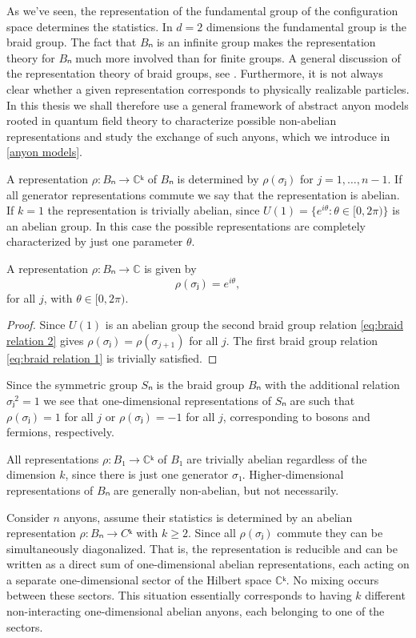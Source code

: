 As we've seen, the representation of the fundamental group of the configuration space determines the statistics. In $d=2$ dimensions the fundamental group is the braid group. The fact that $Bₙ$ is an infinite group makes the representation theory for $Bₙ$ much more involved than for finite groups. A general discussion of the representation theory of braid groups, see \cite{oskar}. Furthermore, it is not always clear whether a given representation corresponds to physically realizable particles. In this thesis we shall therefore use a general framework of abstract anyon models rooted in quantum field theory to characterize possible non-abelian representations and study the exchange of such anyons, which we introduce in \cref{anyon models}.

A representation $ρ:Bₙ→ℂᵏ$ of $Bₙ$ is determined by $ρ(σⱼ)$ for $j = 1,…,n-1$. If all generator representations commute we say that the representation is abelian. If $k = 1$ the representation is trivially abelian, since $U(1) = \{e^{iθ}:θ∈[0,2π)\}$ is an abelian group. In this case the possible representations are completely characterized by just one parameter $θ$.

\begin{lemma}\label{res:abelian repr}
  A representation $ρ:Bₙ→ℂ$ is given by
  \begin{equation}
    ρ(σⱼ) = e^{iθ},
  \end{equation}
  for all $j$, with $θ∈[0,2π)$.
\end{lemma}
\begin{proof}
  Since $U(1)$ is an abelian group the second braid group relation \cref{eq:braid relation 2} gives $ρ(σⱼ) = ρ(σ_{j+1})$ for all $j$. The first braid group relation \cref{eq:braid relation 1} is trivially satisfied.
\end{proof}

\begin{remark}
  Since the symmetric group $Sₙ$ is the braid group $Bₙ$ with the additional relation $σⱼ^2 = 1$ we see that one-dimensional representations of $Sₙ$ are such that $ρ(σⱼ) = 1$ for all $j$ or $ρ(σⱼ) = -1$ for all $j$, corresponding to bosons and fermions, respectively.
\end{remark}


All representations $ρ:B₁→ℂᵏ$ of $B₁$ are trivially abelian regardless of the dimension $k$, since there is just one generator $σ₁$. Higher-dimensional representations of $Bₙ$ are generally non-abelian, but not necessarily.

\begin{example}
  Consider $n$ anyons, assume their statistics is determined by an abelian representation $ρ:Bₙ→Cᵏ$ with $k ≥ 2$. Since all $ρ(σⱼ)$ commute they can be simultaneously diagonalized. That is, the representation is reducible and can be written as a direct sum of one-dimensional abelian representations, each acting on a separate one-dimensional sector of the Hilbert space $ℂᵏ$. No mixing occurs between these sectors. This situation essentially corresponds to having $k$ different non-interacting one-dimensional abelian anyons, each belonging to one of the sectors.
\end{example}

